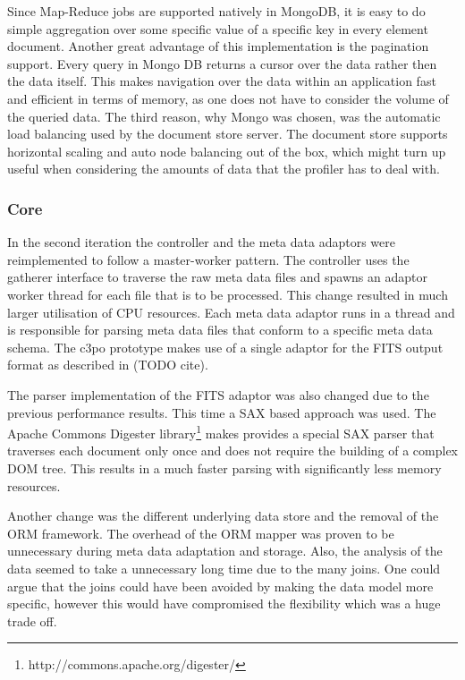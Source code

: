 Since Map-Reduce jobs are supported natively in MongoDB, it is easy to do simple aggregation over some specific value of a specific key in every element document. Another great advantage of this implementation is the pagination support. Every query in Mongo DB returns a cursor over the data rather then the data itself. This makes navigation over the data within an application fast and efficient in terms of memory, as one does not have to consider the volume of the queried data.
The third reason, why Mongo was chosen, was the automatic load balancing used by the document store server. The document store supports horizontal scaling and auto node balancing out of the box, which might turn up useful when considering the amounts of data that the profiler has to deal with.

\subsubsection{Core}
In the second iteration the controller and the meta data adaptors were reimplemented to follow a master-worker pattern.
The controller uses the gatherer interface to traverse the raw meta data files and spawns an adaptor worker thread for each file that is to be processed. This change resulted in much larger utilisation of CPU resources. Each meta data adaptor runs in a thread and is responsible for parsing meta data files that conform to a specific meta data schema. The c3po prototype makes use of a single adaptor for the FITS output format as described in (TODO cite). 

The parser implementation of the FITS adaptor was also changed due to the previous performance results. This time a SAX based approach was used. The Apache Commons Digester library\footnote{http://commons.apache.org/digester/} makes provides a special SAX parser that traverses each document only once and does not require the building of a complex DOM tree. This results in a much faster parsing with significantly less memory resources.

Another change was the different underlying data store and the removal of the ORM framework.
The overhead of the ORM mapper was proven to be unnecessary during meta data adaptation and storage. Also, the analysis of the data seemed to take a unnecessary long time due to the many joins. One could argue that the joins could have been avoided by making the data model more specific, however this would have compromised the flexibility which was a huge trade off.

